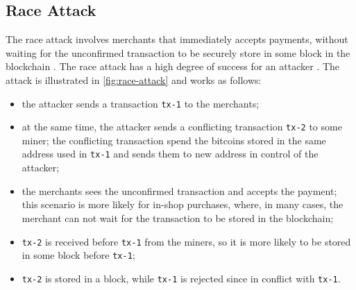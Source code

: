 \subsection{Race Attack}
\label{sub:race-attack}
The race attack involves merchants that immediately accepts payments, without waiting for the unconfirmed transaction to be securely store in some block in the blockchain \cite{bitcoin_wiki_irreversible_transactions}.
The race attack has a high degree of success for an attacker \cite{double_spending_two_for_one}.
The attack is illustrated in \cref{fig:race-attack} and works as follows:
\begin{itemize}
	\item the attacker sends a transaction \texttt{tx-1} to the merchants;
	\item at the same time, the attacker sends a conflicting transaction \texttt{tx-2} to some miner; the conflicting transaction spend the bitcoins stored in the same address used in \texttt{tx-1} and sends them to new address in control of the attacker;
	\item the merchants sees the unconfirmed transaction and accepts the payment; this scenario is more likely for in-shop purchases, where, in many cases, the merchant can not wait for the transaction to be stored in the blockchain;
	\item \texttt{tx-2} is received before \texttt{tx-1} from the miners, so it is more likely to be stored in some block before \texttt{tx-1};
	\item \texttt{tx-2} is stored in a block, while \texttt{tx-1} is rejected since in conflict with \texttt{tx-1}.
\end{itemize}

